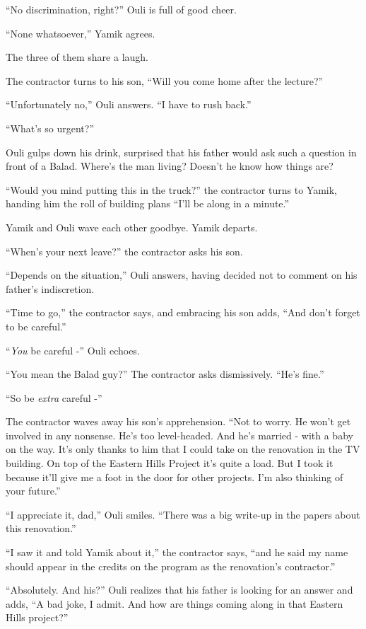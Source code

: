 \documentclass[twoside,11pt]{book}
\begin{document}
``No discrimination, right?'' Ouli is full of good cheer.

``None whatsoever,'' Yamik agrees.

The three of them share a laugh.

The contractor turns to his son, ``Will you come home after the lecture?''

``Unfortunately no,'' Ouli answers. ``I have to rush back.''

``What's so urgent?''

Ouli gulps down his drink, surprised that his father would ask such a question in front of a Balad. Where's the man
living? Doesn't he know how things are?

``Would you mind putting this in the truck?'' the contractor turns to Yamik, handing him the roll of building plans
``I'll be along in a minute.''

Yamik and Ouli wave each other goodbye. Yamik departs.

``When's your next leave?'' the contractor asks his son.

``Depends on the situation,'' Ouli answers, having decided not to comment on his father's
indiscretion.

``Time to go,'' the contractor says, and embracing his son adds, ``And don't
forget to be careful.''

``\textit{You} be careful -'' Ouli echoes.

``You mean the Balad guy?'' The contractor asks dismissively. ``He's
fine.''

``So be \textit{extra} careful -''

The contractor waves away his son's apprehension.  ``Not to worry. He won't get involved in any nonsense.
He's too level-headed. And he's married - with a baby on the way. It's only thanks to him that I could take on the
renovation in the TV building. On top of the Eastern Hills Project it's quite a load. But I took it because it'll give
me a foot in the door for other projects. I'm also thinking of your future.''

``I appreciate it, dad,'' Ouli smiles. ``There was a big write-up in the papers
about this renovation.''

``I saw it and told Yamik about it,'' the contractor says, ``and he said my name
should appear in the credits on the program as the renovation's contractor.''

``Absolutely. And his?'' Ouli realizes that his father is looking for an answer and adds,
``A bad joke, I admit. And how are things coming along in that Eastern Hills project?''
\end{document}
